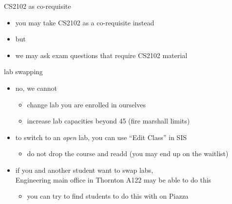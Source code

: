 \begin{frame}{CS2102 as co-requisite}
    \begin{itemize}
        \item you may take CS2102 as a co-requisite instead
        \item but 
        \item we may ask exam questions that require CS2102 material
    \end{itemize}
\end{frame}

\begin{frame}{lab swapping}
    \begin{itemize}
    \item no, we cannot 
    \begin{itemize}
        \item change lab you are enrolled in ourselves
        \item increase lab capacities beyond 45 (fire marshall limits)
        \end{itemize}
    \item to switch to an \textit{open} lab, you can use ``Edit Class'' in SIS
        \begin{itemize}
        \item do not drop the course and readd (you may end up on the waitlist)
        \end{itemize}
    \item if you and another student want to swap labs, \\
          Engineering main office in Thornton A122 may be able to do this
        \begin{itemize}
        \item you can try to find students to do this with on Piazza
        \end{itemize}
    \end{itemize}
\end{frame}

